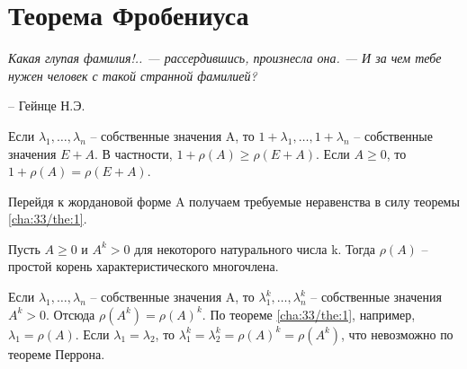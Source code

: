 \chapter{Теорема Фробениуса}
\label{cha:35}

\epigraph{
	\textit{Какая глупая фамилия!.. — рассердившись, произнесла она. — И за чем тебе нужен человек с такой странной фамилией?}}
{-- Гейнце Н.Э.}

\begin{propose}\label{cha:35/propose:1}
	Если $\lambda_1, \dots, \lambda_n$ – собственные значения A, то $1+\lambda_1, \dots, 1+\lambda_n$ – собственные значения $E+A$. В частности, $1+\rho(A) \ge \rho(E+A)$. Если $A\ge0$, то $1+\rho(A) = \rho(E+A)$.
\end{propose}
\begin{Proof}
	Перейдя к жордановой форме A получаем требуемые неравенства в силу теоремы \ref{cha:33/the:1}.
\end{Proof}

\begin{propose}\label{cha:35/propose:2}
	Пусть $A \ge 0$ и $A^k > 0$ для некоторого натурального числа k. Тогда $\rho(A)$ – простой корень характеристического многочлена.
\end{propose}
\begin{Proof}
	Если $\lambda_1, \dots, \lambda_n$ – собственные значения A, то $\lambda_1^k, \dots, \lambda_n^k$ – собственные значения $A^k > 0$. Отсюда $\rho(A^k) = \rho(A)^k$. По теореме \ref{cha:33/the:1}, например, $\lambda_1 = \rho(A)$. Если $\lambda_1 = \lambda_2$, то $\displaystyle \lambda_1^k = \lambda_2^k = \rho(A)^k = \rho(A^k)$, что невозможно по теореме Перрона.
\end{Proof}

